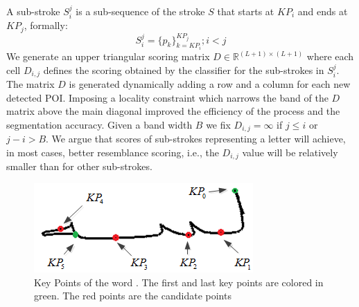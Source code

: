 \documentclass[10pt, conference, compsocconf]{IEEEtran}
\begin{document}
A sub-stroke $S_{i}^{j}$ is a sub-sequence of the stroke $S$ that starts at $KP_{i}$ and ends at $KP_{j}$, formally:
\begin{equation}
S_{i}^{j}=\{p_{k}\}_{k=KP_{i}}^{KP_{j}}; i<j
\end{equation}
We generate an upper triangular scoring matrix $D\in\mathbb{R}^{(L+1)\times (L+1)}$ where each cell $D_{i,j}$ defines the scoring obtained by the classifier for the sub-strokes in $S_i^j$. 
The matrix $D$ is generated dynamically adding a row and a column for each new detected POI. 
Imposing a locality constraint which narrows the band of the $D$ matrix above the main diagonal improved the efficiency of the process and the segmentation accuracy. 
Given a band width $B$ we fix $D_{i,j}=\infty$ if  $j \leq i$ or $j-i>B$.
We argue that scores of sub-strokes representing a letter will achieve, in most cases, better resemblance scoring, i.e., the $D_{i,j}$ value will be relatively smaller than for other sub-strokes.\\

\begin{figure}
\centering
\includegraphics[width=0.7\columnwidth]{./figures/candidate_points}
\caption{Key Points of the word . The first and last key points are colored in green. The red points are the candidate points}
\label{fig:candidate_points}
\end{figure}
\end{document}
